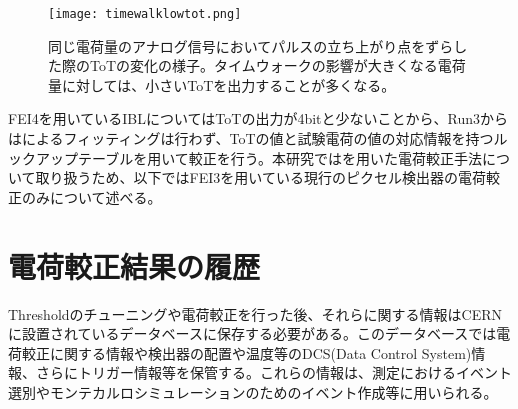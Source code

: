 
\begin{figure}[tbp]
  \centering
  \texttt{[image: timewalklowtot.png]}
  \caption[同じ電荷量のアナログ信号においてパルスの立ち上がり点をずらした際のToTの変化]{同じ電荷量のアナログ信号においてパルスの立ち上がり点をずらした際のToTの変化の様子。タイムウォークの影響が大きくなる電荷量に対しては、小さいToTを出力することが多くなる。}
  \label{fig:calibnijikouka}
\end{figure}

FEI4を用いているIBLについてはToTの出力が4bitと少ないことから、Run3からはによるフィッティングは行わず、ToTの値と試験電荷の値の対応情報を持つルックアップテーブルを用いて較正を行う。本研究ではを用いた電荷較正手法について取り扱うため、以下ではFEI3を用いている現行のピクセル検出器の電荷較正のみについて述べる。

\section{電荷較正結果の履歴}
\label{sec:probrem}
Thresholdのチューニングや電荷較正を行った後、それらに関する情報はCERNに設置されているデータベース\cite{pixeldb}に保存する必要がある。このデータベースでは電荷較正に関する情報や検出器の配置や温度等のDCS(Data Control System)情報、さらにトリガー情報等を保管する。これらの情報は、測定におけるイベント選別やモンテカルロシミュレーションのためのイベント作成等に用いられる。

